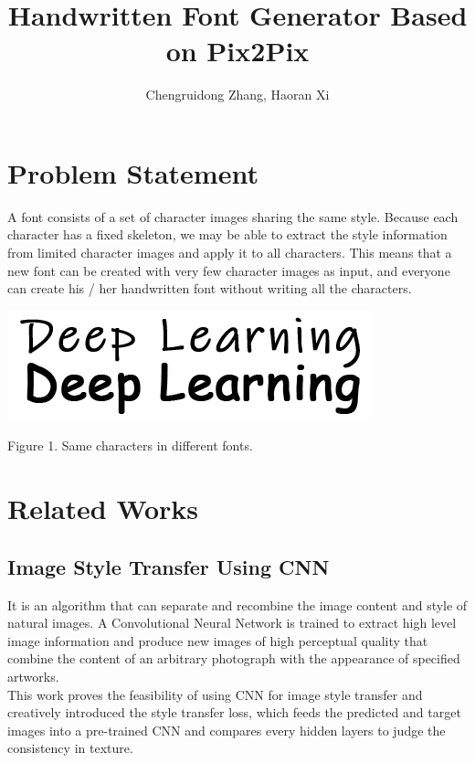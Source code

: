 \documentclass[letterpaper]{article}
\begin{document}
%
\title{Handwritten Font Generator Based on Pix2Pix}
\author{Chengruidong Zhang, Haoran Xi}
\maketitle

\section{Problem Statement}
A font consists of a set of character images sharing the same style. Because each character has a fixed skeleton, we may be able to extract the style information from limited character images and apply it to all characters. This means that a new font can be created with very few character images as input, and everyone can create his / her handwritten font without writing all the characters.

\begin{center}
    \includegraphics[]{update-fig-sample.png}

    Figure 1. Same characters in different fonts.
\end{center}


\section{Related Works}
\subsection{Image Style Transfer Using CNN}
It is an algorithm that can separate and recombine the image content and style of natural images. A Convolutional Neural Network is trained to extract high level image information and produce new images of high perceptual quality that combine the content of an arbitrary photograph with the appearance of specified artworks.
\\
This work proves the feasibility of using CNN for image style transfer and creatively introduced the style transfer loss, which feeds the predicted and target images into a pre-trained CNN and compares every hidden layers to judge the consistency in texture.
\end{document}
